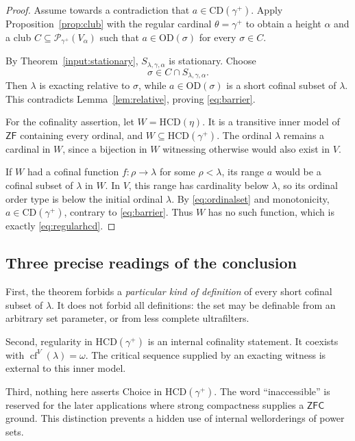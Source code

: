 \documentclass[11pt,letterpaper]{article}
\theoremstyle{definition}
\newcommand{\ZFC}{\mathsf{ZFC}}
\newcommand{\ZF}{\mathsf{ZF}}
\newcommand{\OD}{\mathrm{OD}}
\newcommand{\cf}{\operatorname{cf}}
\newcommand{\CD}{\mathrm{CD}}
\newcommand{\HCD}{\mathrm{HCD}}
\newcommand{\Pow}{\mathcal{P}}
\begin{document}
\begin{proof}
Assume towards a contradiction that $a\in\CD(\gamma^+)$. Apply Proposition~\ref{prop:club} with the regular cardinal $\theta=\gamma^+$ to obtain a height $\alpha$ and a club $C\subseteq\Pow_{\gamma^+}(V_\alpha)$ such that $a\in\OD(\sigma)$ for every $\sigma\in C$.

By Theorem~\ref{input:stationary}, $S_{\lambda,\gamma,\alpha}$ is stationary. Choose
\[
                 \sigma\in C\cap S_{\lambda,\gamma,\alpha}.
\]
Then $\lambda$ is exacting relative to $\sigma$, while $a\in\OD(\sigma)$ is a short cofinal subset of $\lambda$. This contradicts Lemma~\ref{lem:relative}, proving \eqref{eq:barrier}.

For the cofinality assertion, let $W=\HCD(\eta)$. It is a transitive inner model of $\ZF$ containing every ordinal, and $W\subseteq\HCD(\gamma^+)$. The ordinal $\lambda$ remains a cardinal in $W$, since a bijection in $W$ witnessing otherwise would also exist in $V$.

If $W$ had a cofinal function $f:\rho\to\lambda$ for some $\rho<\lambda$, its range $a$ would be a cofinal subset of $\lambda$ in $W$. In $V$, this range has cardinality below $\lambda$, so its ordinal order type is below the initial ordinal $\lambda$. By \eqref{eq:ordinalset} and monotonicity, $a\in\CD(\gamma^+)$, contrary to \eqref{eq:barrier}. Thus $W$ has no such function, which is exactly \eqref{eq:regularhcd}.
\end{proof}

\subsection{Three precise readings of the conclusion}

First, the theorem forbids a \emph{particular kind of definition} of every short cofinal subset of $\lambda$. It does not forbid all definitions: the set may be definable from an arbitrary set parameter, or from less complete ultrafilters.

Second, regularity in $\HCD(\gamma^+)$ is an internal cofinality statement. It coexists with $\cf^V(\lambda)=\omega$. The critical sequence supplied by an exacting witness is external to this inner model.

Third, nothing here asserts Choice in $\HCD(\gamma^+)$. The word ``inaccessible'' is reserved for the later applications where strong compactness supplies a $\ZFC$ ground. This distinction prevents a hidden use of internal wellorderings of power sets.
\end{document}
